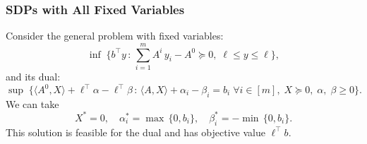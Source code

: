 \documentclass[10pt, a4paper]{article}
\newcommand{\suchthat}{\,:\,}
\newcommand{\skal}[2]{\langle{#1},{#2}\rangle}
\newcommand{\T}{^{\top}}
\begin{document}
\subsubsection{SDPs with All Fixed Variables}

Consider the general problem with fixed variables:
\[
  \inf\; \{ b\T y \suchthat \sum_{i=1}^m A^i\, y_i - A^0 \succeq 0,\; \ell \leq y \leq \ell\},
\]
and its dual:
\[
  \sup\; \{\skal{A^0}{X} + \ell\T \alpha - \ell\T \beta \suchthat \skal{A}{X} +
  \alpha_i - \beta_i = b_i\; \forall i \in [m],\; X \succeq 0,\; \alpha,\; \beta \geq 0\}.
\]
We can take
\[
X^* = 0,\quad
\alpha^*_i = \max\,\{0, b_i\}, \quad
\beta^*_i = -\min\,\{0, b_i\}.
\]
This solution is feasible for the dual and has objective value $\ell\T b$.

\begin{small}
   
   
\end{small}
\end{document}
